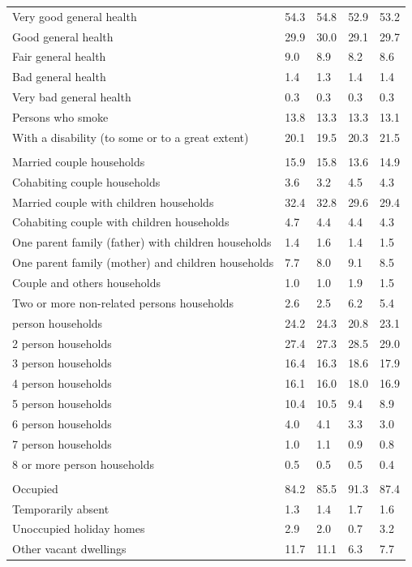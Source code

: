 \documentclass{article}
\begin{document}
\begin{table}[h]
\begin{tabular}{KTTTT}
    \hline
Very good general health & 54.3& 54.8&52.9& 53.2\\
Good general health & 29.9& 30.0& 29.1& 29.7\\
Fair general health & 9.0& 8.9&8.2& 8.6\\
Bad general health & 1.4& 1.3&1.4& 1.4\\
Very bad general health & 0.3& 0.3&0.3& 0.3\\
    \hline
Persons who smoke & 13.8& 13.3&13.3& 13.1\\
    \hline
With a disability (to some or to a great extent) & 20.1& 19.5&20.3& 21.5\\
\hline
    \\ 
    \hline
Married couple households & 15.9& 15.8& 13.6& 14.9\\
Cohabiting couple households & 3.6& 3.2& 4.5& 4.3\\
Married couple with children households & 32.4& 32.8& 29.6& 29.4\\
Cohabiting couple with children households & 4.7& 4.4& 4.4& 4.3\\
One parent family (father) with  children households & 1.4& 1.6& 1.4& 1.5\\
One parent family (mother) and children households & 7.7& 8.0& 9.1& 8.5\\
Couple and others households  & 1.0& 1.0& 1.9& 1.5\\
Two or more non-related persons households & 2.6& 2.5& 6.2& 5.4\\
     person households & 24.2& 24.3& 20.8& 23.1\\
2 person households & 27.4& 27.3& 28.5& 29.0\\
3 person households & 16.4& 16.3& 18.6& 17.9\\
4 person households & 16.1& 16.0& 18.0& 16.9\\
5 person households & 10.4& 10.5&  9.4&  8.9\\
6 person households & 4.0& 4.1& 3.3& 3.0\\
7 person households & 1.0& 1.1& 0.9& 0.8\\
8 or more person households & 0.5& 0.5& 0.5& 0.4\\
\hline
    \\ 
    \hline
Occupied & 84.2& 85.5& 91.3& 87.4\\
Temporarily absent & 1.3& 1.4& 1.7& 1.6\\
Unoccupied holiday homes & 2.9& 2.0& 0.7& 3.2\\
Other vacant dwellings & 11.7& 11.1&  6.3&  7.7\\
\hline
\end{tabular}
\end{table}
\end{document}
